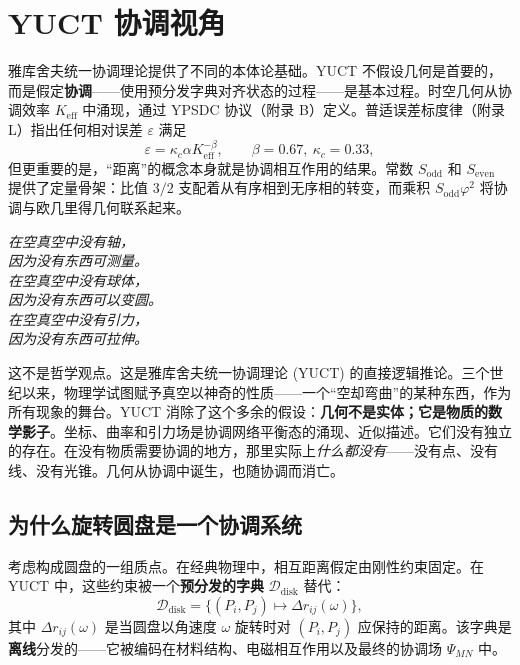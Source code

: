 \documentclass[12pt,a4paper]{article}
\newcommand{\kappac}{\kappa_c}
\newcommand{\eps}{\varepsilon}
\newcommand{\betaf}{\beta}
\newcommand{\Sodd}{S_{\mathrm{odd}}}
\newcommand{\Seven}{S_{\mathrm{even}}}
\begin{document}
	\section{YUCT 协调视角}
	\label{sec:yuct}
	
	雅库舍夫统一协调理论提供了不同的本体论基础。YUCT 不假设几何是首要的，而是假定\textbf{协调}——使用预分发字典对齐状态的过程——是基本过程。时空几何从协调效率 \(K_{\mathrm{eff}}\) 中涌现，通过 YPSDC 协议（附录 B）定义。普适误差标度律（附录 L）指出任何相对误差 \(\eps\) 满足
	\[
	\eps = \kappac \alpha K_{\mathrm{eff}}^{-\betaf}, \qquad \betaf = 0.67,\ \kappac = 0.33,
	\]
	但更重要的是，“距离”的概念本身就是协调相互作用的结果。常数 \(\Sodd\) 和 \(\Seven\) 提供了定量骨架：比值 \(3/2\) 支配着从有序相到无序相的转变，而乘积 \(\Sodd\varphi^2\) 将协调与欧几里得几何联系起来。
	
	\begin{tcolorbox}[
		title={\bfseries 一个逻辑上基本的陈述},
		colback=blue!3!white,
		colframe=blue!50!black,
		fonttitle=\bfseries,
		sharp corners
		]
		\small
		\textit{在空真空中没有轴，\\
			因为没有东西可测量。\\
			在空真空中没有球体，\\
			因为没有东西可以变圆。\\
			在空真空中没有引力，\\
			因为没有东西可拉伸。}
		
		\medskip
		这不是哲学观点。这是雅库舍夫统一协调理论 (YUCT) 的直接逻辑推论。三个世纪以来，物理学试图赋予真空以神奇的性质——一个“空却弯曲”的某种东西，作为所有现象的舞台。YUCT 消除了这个多余的假设：\textbf{几何不是实体；它是物质的数学影子}。坐标、曲率和引力场是协调网络平衡态的涌现、近似描述。它们没有独立的存在。在没有物质需要协调的地方，那里实际上\textit{什么都没有}——没有点、没有线、没有光锥。几何从协调中诞生，也随协调而消亡。
	\end{tcolorbox}
	
	\subsection{为什么旋转圆盘是一个协调系统}
	\label{subsec:disk-coordination}
	
	考虑构成圆盘的一组质点。在经典物理中，相互距离假定由刚性约束固定。在 YUCT 中，这些约束被一个\textbf{预分发的字典} \(\mathcal{D}_{\text{disk}}\) 替代：
	\[
	\mathcal{D}_{\text{disk}} = \bigl\{ (P_i, P_j) \mapsto \Delta r_{ij}(\omega) \bigr\},
	\]
	其中 \(\Delta r_{ij}(\omega)\) 是当圆盘以角速度 \(\omega\) 旋转时对 \((P_i,P_j)\) 应保持的距离。该字典是\textbf{离线}分发的——它被编码在材料结构、电磁相互作用以及最终的协调场 \(\Psi_{MN}\) 中。
	
\end{document}
